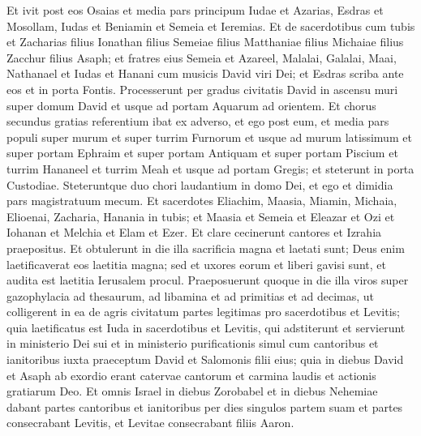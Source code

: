 \begin{biblechapter}
\begin{biblechapter}
\begin{biblechapter}
\begin{biblechapter}
\begin{biblechapter}
\begin{biblechapter}
\begin{biblechapter}
\begin{biblechapter}
\begin{biblechapter}
\begin{biblechapter}
\begin{biblechapter}
\begin{biblechapter}
\verse Et ivit post eos Osaias et media pars principum Iudae 
 \verse et Azarias, Esdras et Mosollam, 
\verse Iudas et Beniamin et Semeia et Ieremias. 
\verse Et de sacerdotibus cum tubis et Zacharias filius Ionathan filius Semeiae filius Matthaniae filius Michaiae filius Zacchur filius Asaph; 
 \verse et fratres eius Semeia et Azareel, Malalai, Galalai, Maai, Nathanael et Iudas et Hanani cum musicis David viri Dei; et Esdras scriba ante eos et in porta Fontis. 
\verse Processerunt per gradus civitatis David in ascensu muri super domum David et usque ad portam Aquarum ad orientem.
 \verse Et chorus secundus gratias referentium ibat ex adverso, et ego post eum, et media pars populi super murum et super turrim Furnorum et usque ad murum latissimum 
\verse et super portam Ephraim et super portam Antiquam et super portam Piscium et turrim Hananeel et turrim Meah et usque ad portam Gregis; et steterunt in porta Custodiae.
 \verse Steteruntque duo chori laudantium in domo Dei, et ego et dimidia pars magistratuum mecum. 
\verse Et sacerdotes Eliachim, Maasia, Miamin, Michaia, Elioenai, Zacharia, Hanania in tubis; 
\verse et Maasia et Semeia et Eleazar et Ozi et Iohanan et Melchia et Elam et Ezer. Et clare cecinerunt cantores et Izrahia praepositus. 
\verse Et obtulerunt in die illa sacrificia magna et laetati sunt; Deus enim laetificaverat eos laetitia magna; sed et uxores eorum et liberi gavisi sunt, et audita est laetitia Ierusalem procul.
 \verse Praeposuerunt quoque in die illa viros super gazophylacia ad thesaurum, ad libamina et ad primitias et ad decimas, ut colligerent in ea de agris civitatum partes legitimas pro sacerdotibus et Levitis; quia laetificatus est Iuda in sacerdotibus et Levitis, qui adstiterunt 
\verse et servierunt in ministerio Dei sui et in ministerio purificationis simul cum cantoribus et ianitoribus iuxta praeceptum David et Salomonis filii eius; 
\verse quia in diebus David et Asaph ab exordio erant catervae cantorum et carmina laudis et actionis gratiarum Deo. 
 \verse Et omnis Israel in diebus Zorobabel et in diebus Nehemiae dabant partes cantoribus et ianitoribus per dies singulos partem suam et partes consecrabant Levitis, et Levitae consecrabant filiis Aaron.
 

\end{biblechapter}
\end{biblechapter}
\end{biblechapter}
\end{biblechapter}
\end{biblechapter}
\end{biblechapter}
\end{biblechapter}
\end{biblechapter}
\end{biblechapter}
\end{biblechapter}
\end{biblechapter}
\end{biblechapter}
